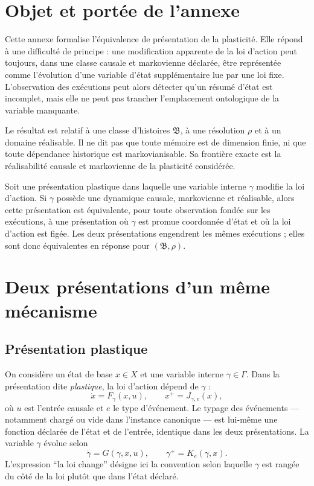 \section{Objet et portée de l'annexe}
\label{annexe-K-objet}

Cette annexe formalise l'équivalence de présentation de la plasticité.
Elle répond à une difficulté de principe : une modification apparente de
la loi d'action peut toujours, dans une classe causale et markovienne
déclarée, être représentée comme l'évolution d'une variable d'état
supplémentaire lue par une loi fixe. L'observation des exécutions peut
alors détecter qu'un résumé d'état est incomplet, mais elle ne peut pas
trancher l'emplacement ontologique de la variable manquante.

Le résultat est relatif à une classe d'histoires $\mathfrak B$, à une
résolution $\rho$ et à un domaine réalisable. Il ne dit pas que toute
mémoire est de dimension finie, ni que toute dépendance historique est
markovianisable. Sa frontière exacte est la réalisabilité causale et
markovienne de la plasticité considérée.

\begin{encadre}[title={Résultat directeur}]
Soit une présentation plastique dans laquelle une variable interne $\gamma$ modifie la loi d'action. Si $\gamma$ possède une dynamique causale, markovienne et réalisable, alors cette présentation est équivalente, pour toute observation fondée sur les exécutions, à une
présentation où $\gamma$ est promue coordonnée d'état et où la loi d'action est figée. Les deux présentations engendrent les mêmes exécutions ; elles sont donc équivalentes en réponse pour \((\mathfrak B,\rho)\).
\end{encadre}

\section{Deux présentations d'un même mécanisme}
\label{annexe-K-deux-presentations}

\subsection{Présentation plastique}

On considère un état de base $x\in X$ et une variable interne
$\gamma\in\Gamma$. Dans la présentation dite \emph{plastique}, la loi
d'action dépend de $\gamma$ :
\[
\dot x=F_{\gamma}(x,u),
\qquad
x^+=J_{\gamma,e}(x),
\]
où $u$ est l'entrée causale et $e$ le type d'événement. Le typage des
événements --- notamment chargé ou vide dans l'instance canonique --- est
lui-même une fonction déclarée de l'état et de l'entrée, identique dans
les deux présentations. La variable $\gamma$ évolue selon
\[
\dot\gamma=G(\gamma,x,u),
\qquad
\gamma^+=K_e(\gamma,x).
\]
L'expression ``la loi change'' désigne ici la convention selon laquelle
$\gamma$ est rangée du côté de la loi plutôt que dans l'état déclaré.

